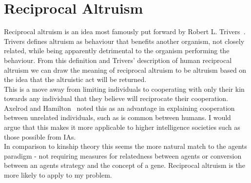 \documentclass[]{final_report}
\begin{document}
\section{Reciprocal Altruism}
Reciprocal altruism is an idea most famously put forward by Robert L. Trivers~\cite{trivers1971evolution}. Trivers defines altruism as behaviour that benefits another organism, not closely related, while being apparently detrimental to the organism performing the behaviour. From this definition and Trivers' description of human reciprocal altruism we can draw the meaning of reciprocal altruism to be altruism based on the idea that the altruistic act will be returned.\\
This is a move away from limiting individuals to cooperating with only their kin towards any individual that they believe will reciprocate their cooperation. Axelrod and Hamilton~\cite{evolution_of_cooperation} noted this as an advantage in explaining cooperation between unrelated individuals, such as is common between humans. I would argue that this makes it more applicable to higher intelligence societies such as those possible from IAs.\\
In comparison to kinship theory this seems the more natural match to the agents paradigm - not requiring measures for relatedness between agents or conversion between an agents strategy and the concept of a gene. Reciprocal altruism is the more likely to apply to my problem.
\end{document}
